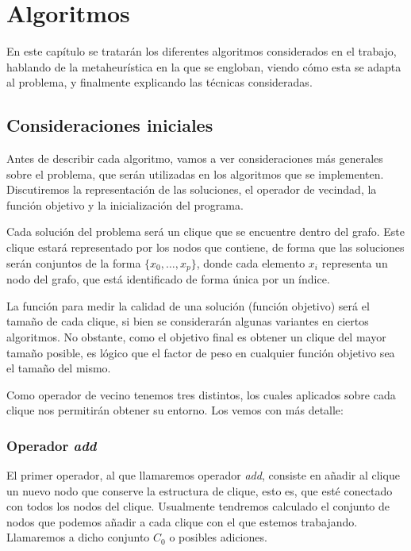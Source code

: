 \chapter{Algoritmos}\label{ch:algoritmos}

En este capítulo se tratarán los diferentes algoritmos considerados en el trabajo,
hablando de la metaheurística en la que se engloban, viendo cómo esta se adapta al
problema, y finalmente explicando las técnicas consideradas.

\section{Consideraciones iniciales}

Antes de describir cada algoritmo, vamos a ver consideraciones más generales sobre el problema, que serán
utilizadas en los algoritmos que se implementen. Discutiremos la representación de las soluciones, el
operador de vecindad, la función objetivo y la inicialización del programa.

Cada solución del problema será un clique que se encuentre dentro del grafo. Este clique estará representado
por los nodos que contiene, de forma que las soluciones serán conjuntos de la forma $\{x_0, \dots, x_p\}$,
donde cada elemento $x_i$ representa un nodo del grafo, que está identificado de forma única por un índice.

La función para medir la calidad de una solución (función objetivo) será el tamaño de cada clique, si bien
se considerarán algunas variantes en ciertos algoritmos. No obstante, como el objetivo final es obtener un clique
del mayor tamaño posible, es lógico que el factor de peso en cualquier función objetivo sea el tamaño del mismo.

Como operador de vecino tenemos tres distintos, los cuales aplicados sobre cada clique nos permitirán obtener su entorno.
Los vemos con más detalle:

\subsection{Operador \textit{add}}

El primer operador, al que llamaremos operador \textit{add}, consiste en añadir al clique un
nuevo nodo que conserve la estructura de clique, esto es, que esté conectado con todos los
nodos del clique. Usualmente tendremos calculado el conjunto de nodos que podemos añadir
a cada clique con el que estemos trabajando. Llamaremos a dicho conjunto $C_0$ o posibles adiciones.

